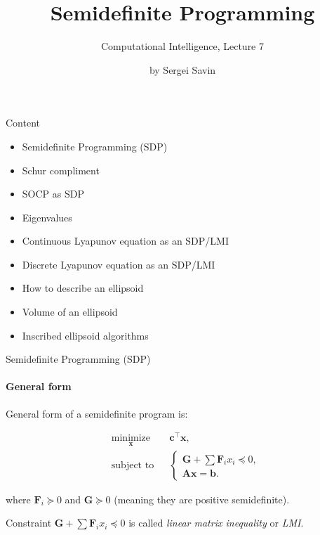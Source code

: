 \documentclass{beamer}
\title{Semidefinite Programming}
\subtitle{Computational Intelligence, Lecture 7}
\author{by Sergei Savin}
\date{\mydate}
\begin{document}
\maketitle


\begin{frame}{Content}

\begin{itemize}
\item  Semidefinite Programming (SDP)
\item  Schur compliment
\item  SOCP as SDP
\item  Eigenvalues
\item  Continuous Lyapunov equation as an SDP/LMI
\item  Discrete Lyapunov equation as an SDP/LMI
\item How to describe an ellipsoid
\item Volume of an ellipsoid
\item Inscribed ellipsoid algorithms
\end{itemize}
\end{frame}



\begin{frame}{Semidefinite Programming (SDP)}
\framesubtitle{General form}
\begin{flushleft}

General form of a semidefinite program is:

%
\begin{equation}
\begin{aligned}
& \underset{\mathbf{x}}{\text{minimize}}
& & \mathbf{c}^\top\mathbf{x}, \\
& \text{subject to}
& & \begin{cases}
    \mathbf{G} + \sum \mathbf{F}_i x_i \preceq 0, \\
    \mathbf{A}\mathbf{x} = \mathbf{b}.
    \end{cases}
\end{aligned}
\end{equation}

where $\mathbf{F}_i \succeq 0$ and $\mathbf{G} \succeq 0$ (meaning they are positive semidefinite).

\bigskip

Constraint $\mathbf{G} + \sum \mathbf{F}_i x_i \preceq 0$ is called \emph{linear matrix inequality} or \emph{LMI}.
 
\end{flushleft}
\end{frame}
\end{document}
